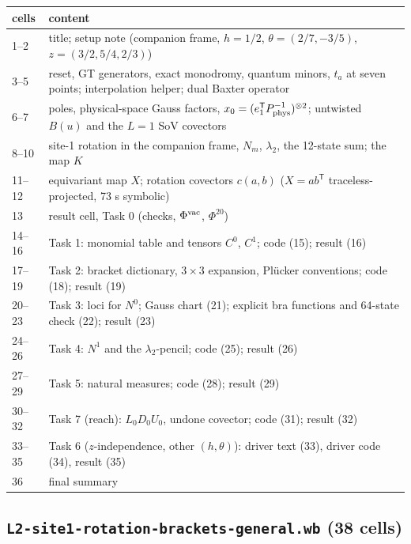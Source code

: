 \documentclass[10pt]{article}
\begin{document}
\begin{center}\small\setlength{\tabcolsep}{3pt}\begin{longtable}{@{}lp{12cm}@{}}\toprule
\textbf{cells} & \textbf{content} \\\midrule\endhead
1--2 & title; setup note (companion frame, $h=1/2$, $\theta=(2/7,-3/5)$, $z=(3/2,5/4,2/3)$) \\
3--5 & reset, GT generators, exact monodromy, quantum minors, $t_a$ at seven points; interpolation helper; dual Baxter operator \\
6--7 & poles, physical-space Gauss factors, $x_0=(e_1^{\mathsf T}P_{\rm phys}^{-1})^{\otimes2}$; untwisted $B(u)$ and the $L=1$ SoV covectors \\
8--10 & site-1 rotation in the companion frame, $N_m$, $\lambda_2$, the 12-state sum; the map $K$ \\
11--12 & equivariant map $X$; rotation covectors $c(a,b)$ ($X=ab^{\mathsf T}$ traceless-projected, 73 s symbolic) \\
13 & result cell, Task 0 (checks, $\Phi^{\rm vac}$, $\Phi^{20}$) \\
14--16 & Task 1: monomial table and tensors $C^0$, $C^1$; code (15); result (16) \\
17--19 & Task 2: bracket dictionary, $3\times3$ expansion, Pl\"ucker conventions; code (18); result (19) \\
20--23 & Task 3: loci for $N^0$; Gauss chart (21); explicit bra functions and 64-state check (22); result (23) \\
24--26 & Task 4: $N^1$ and the $\lambda_2$-pencil; code (25); result (26) \\
27--29 & Task 5: natural measures; code (28); result (29) \\
30--32 & Task 7 (reach): $L_0D_0U_0$, undone covector; code (31); result (32) \\
33--35 & Task 6 ($z$-independence, other $(h,\theta)$): driver text (33), driver code (34), result (35) \\
36 & final summary \\
\bottomrule\end{longtable}\end{center}

\subsection{\texttt{L2-site1-rotation-brackets-general.wb} (38 cells)}\label{sec:cellsG}
\end{document}
